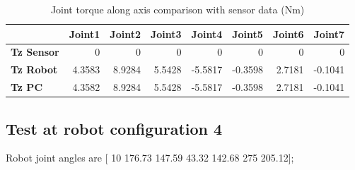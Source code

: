 \begin{table}[h!]
	\centering
	\caption{Joint torque along axis comparison with sensor data (Nm)}
	\label{wrech_Sensor_Pose3}
	\begin{tabular}{|l|r|r|r|r|r|r|r|}
		\hline
		\textbf{} & \textbf{Joint1} & \textbf{Joint2} & \textbf{Joint3} & \textbf{Joint4} & \textbf{Joint5} & \textbf{Joint6} & \textbf{Joint7} \\ \hline
		\textbf{Tz Sensor}  & 0           & 0           & 0            & 0           & 0           & 0           & 0           \\ \hline
		\textbf{Tz Robot}  	& 4.3583           & 8.9284           & 5.5428            & -5.5817           & -0.3598           & 2.7181           & -0.1041           \\ \hline
		\textbf{Tz PC}  	& 4.3582           & 8.9284           & 5.5428            & -5.5817           & -0.3598           & 2.7181           & -0.1041           \\ \hline
	\end{tabular}
\end{table}


\subsection{Test at robot configuration 4}
Robot joint angles are  [ 10        176.73        147.59         43.32        142.68           275        205.12];

